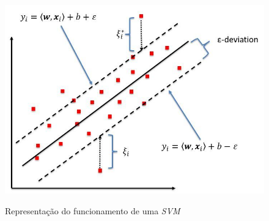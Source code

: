 \begin{figure}[h]
    \centering
    \includegraphics[scale=1.0]{monography/img/svr_example.png}
    \label{figure:support_vector_machine}
    \caption[Representação do funcionamento de uma \textit{\acrshort{SVM}}]{Representação do funcionamento de uma \textit{\acrshort{SVM}}\footnotemark}
\end{figure}

